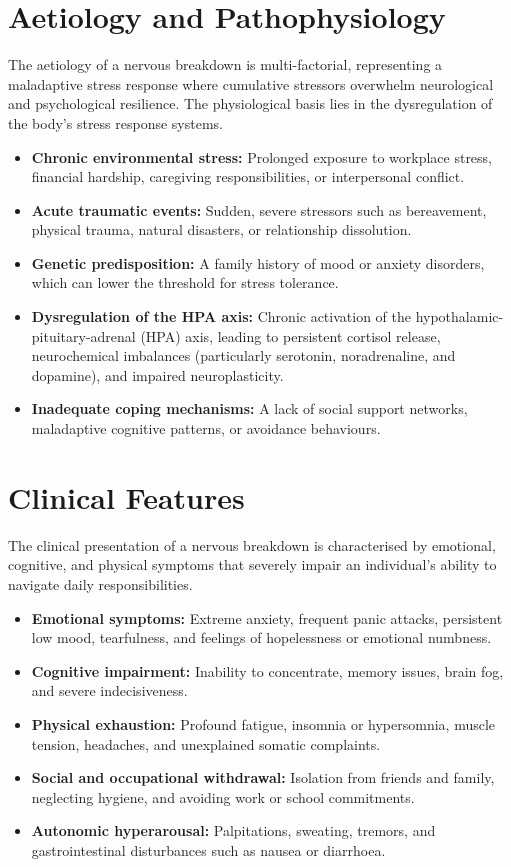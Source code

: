 \section*{Aetiology and Pathophysiology}
The aetiology of a nervous breakdown is multi-factorial, representing a maladaptive stress response where cumulative stressors overwhelm neurological and psychological resilience. The physiological basis lies in the dysregulation of the body's stress response systems.
\begin{itemize}
    \item \textbf{Chronic environmental stress:} Prolonged exposure to workplace stress, financial hardship, caregiving responsibilities, or interpersonal conflict.
    \item \textbf{Acute traumatic events:} Sudden, severe stressors such as bereavement, physical trauma, natural disasters, or relationship dissolution.
    \item \textbf{Genetic predisposition:} A family history of mood or anxiety disorders, which can lower the threshold for stress tolerance.
    \item \textbf{Dysregulation of the HPA axis:} Chronic activation of the hypothalamic-pituitary-adrenal (HPA) axis, leading to persistent cortisol release, neurochemical imbalances (particularly serotonin, noradrenaline, and dopamine), and impaired neuroplasticity.
    \item \textbf{Inadequate coping mechanisms:} A lack of social support networks, maladaptive cognitive patterns, or avoidance behaviours.
\end{itemize}

\section*{Clinical Features}
The clinical presentation of a nervous breakdown is characterised by emotional, cognitive, and physical symptoms that severely impair an individual's ability to navigate daily responsibilities.
\begin{itemize}
    \item \textbf{Emotional symptoms:} Extreme anxiety, frequent panic attacks, persistent low mood, tearfulness, and feelings of hopelessness or emotional numbness.
    \item \textbf{Cognitive impairment:} Inability to concentrate, memory issues, brain fog, and severe indecisiveness.
    \item \textbf{Physical exhaustion:} Profound fatigue, insomnia or hypersomnia, muscle tension, headaches, and unexplained somatic complaints.
    \item \textbf{Social and occupational withdrawal:} Isolation from friends and family, neglecting hygiene, and avoiding work or school commitments.
    \item \textbf{Autonomic hyperarousal:} Palpitations, sweating, tremors, and gastrointestinal disturbances such as nausea or diarrhoea.
\end{itemize}

